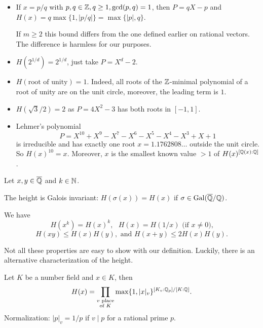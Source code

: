 \documentclass{beamer}
\begin{document}
\begin{frame}
  \begin{itemize}
  \item If $x=p/q$ with $p,q\in{\mathbb{Z}},q\ge 1,\gcd(p,q)=1$, then
    $P=qX-p$ and
    $H(x) = q\max\{1,|p/q|\} = \max\{|p|,q\}.$

    If $m\ge 2$ this bound \alert{differs}  from the one defined
    earlier on rational vectors. The difference is harmless for our purposes.

  \item $H(2^{1/d}) = 2^{1/d}$, just take $P=X^d-2$.

  \item $H(\text{root of unity}) = 1$. Indeed, all roots of the
    ${\mathbb{Z}}$-minimal polynomial of a root of unity are on the unit
    circle, moreover, the leading term is $1$.

  \item $H(\sqrt{3}/2) = 2$ as $P = 4X^2-3$ has both roots in
    $[-1,1]$.
  \item Lehmer's polynomial
    $$P=X^{10}+X^9-X^7-X^6-X^5-X^4-X^3+X+1$$
    is
    irreducible and has exactly one root $x=1.1762808\ldots$ outside the
    unit circle. So $H(x)^{10} = x$. Moreover, $x$ is the \alert{smallest known}
    value $>1$ of $H(x)^{[{\mathbb{Q}}(x):{\mathbb{Q}}]}$. 
    
  \end{itemize}
\end{frame}


\begin{frame}
  Let $x,y\in{\overline{\mathbb{Q}}}$ and $k\in{\mathbb{N}}$. 
  
  The height is Galois invariant:
  $H(\sigma(x))=H(x)$ if $\sigma\in\mathrm{Gal}({\overline{\mathbb{Q}}}/{\mathbb{Q}})$.
  
  We have $$H(x^k) = H(x)^k,\text{ }H(x)=H(1/x)
  \text{  (if $x\not=0$),}$$
  $$ H(xy)\le H(x)H(y), \text{ and }H(x+y)\le 2H(x)H(y).$$

  Not all these properties are easy to show with our definition.
  Luckily, there is  an alternative characterization of the height.

  \begin{lemma}
    Let $K$ be a number field and $x\in K$, then
    $$H(x) = \prod_{\substack{v\text{ place} \\\text{of $K$}}}
    \max\{1,|x|_v\}^{[K_v:{\mathbb{Q}}_p]/[K:{\mathbb{Q}}]}.$$
    Normalization: $|p|_v=1/p$ if $v\mid p$ for a rational prime $p$.
  \end{lemma}
  
\end{frame}
\end{document}
